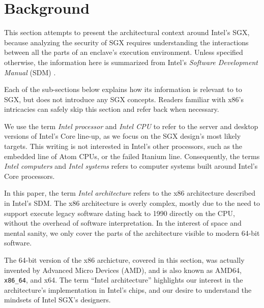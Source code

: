 \section{Background}
\label{sec:background}

This section attempts to present the architectural context around Intel's SGX,
because analyzing the security of SGX requires understanding the interactions
between all the parts of an enclave's execution environment. Unless specified
otherwise, the information here is summarized from Intel's
\textit{Software Development Manual} (SDM) \cite{intel2015sdm}.

Each of the sub-sections below explains how its information is relevant to
to SGX, but does not introduce any SGX concepts. Readers familiar with x86's
intricacies can safely skip this section and refer back when necessary.

We use the term \textit{Intel processor} and \textit{Intel CPU} to refer to the
server and desktop versions of Intel's Core line-up, as we focus on the SGX
design's most likely targets. This writing is not interested in Intel's other
processors, such as the embedded line of Atom CPUs, or the failed Itanium line.
Consequently, the terms \textit{Intel computers} and \textit{Intel systems}
refers to computer systems built around Intel's Core processors.

In this paper, the term \textit{Intel architecture} refers to the x86
architecture described in Intel's SDM. The x86 architecture is overly complex,
mostly due to the need to support execute legacy software dating back to 1990
directly on the CPU, without the overhead of software interpretation. In the
interest of space and mental sanity, we only cover the parts of the
architecture visible to modern 64-bit software.

The 64-bit version of the x86 archicture, covered in this section, was actually
invented by Advanced Micro Devices (AMD), and is also known as AMD64,
\texttt{x86\_64}, and x64. The term ``Intel architecture'' highlights our
interest in the architecture's implementation in Intel's chips, and our desire
to understand the mindsets of Intel SGX's designers.



















